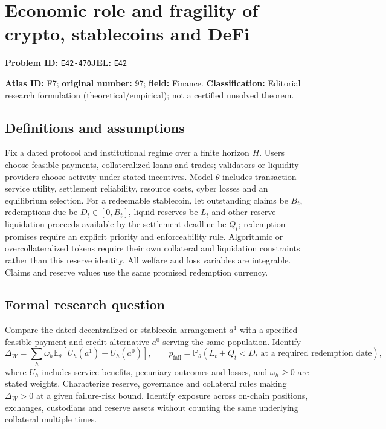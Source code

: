 \documentclass[11pt,a4paper]{article}
\begin{document}
\section*{Economic role and fragility of crypto, stablecoins and DeFi}
\textbf{Problem ID:} \texttt{E42-470}\quad \textbf{JEL:} \texttt{E42}\par
\label{problem:OP-0097}
\label{atlas:prob:F7}

\noindent\textbf{Atlas ID:} F7; \textbf{original number:} 97; \textbf{field:} Finance. \textbf{Classification:} Editorial research formulation (theoretical/empirical); not a certified unsolved theorem.

\subsection*{Definitions and assumptions}
Fix a dated protocol and institutional regime over a finite horizon $H$. Users choose feasible payments, collateralized loans and trades; validators or liquidity providers choose activity under stated incentives. Model $\theta$ includes transaction-service utility, settlement reliability, resource costs, cyber losses and an equilibrium selection. For a redeemable stablecoin, let outstanding claims be $B_t$, redemptions due be $D_t\in[0,B_t]$, liquid reserves be $L_t$ and other reserve liquidation proceeds available by the settlement deadline be $Q_t$; redemption promises require an explicit priority and enforceability rule. Algorithmic or overcollateralized tokens require their own collateral and liquidation constraints rather than this reserve identity. All welfare and loss variables are integrable. Claims and reserve values use the same promised redemption currency.

\subsection*{Formal research question}
Compare the dated decentralized or stablecoin arrangement $a^1$ with a specified feasible payment-and-credit alternative $a^0$ serving the same population. Identify
\[
 \Delta_W=\sum_h\omega_h\mathbb E_\theta[U_h(a^1)-U_h(a^0)],
 \qquad
 p_{\mathrm{fail}}=\mathbb P_\theta(L_t+Q_t<D_t
   \text{ at a required redemption date}),
\]
where $U_h$ includes service benefits, pecuniary outcomes and losses, and $\omega_h\ge0$ are stated weights. Characterize reserve, governance and collateral rules making $\Delta_W>0$ at a given failure-risk bound. Identify exposure across on-chain positions, exchanges, custodians and reserve assets without counting the same underlying collateral multiple times.
\end{document}
